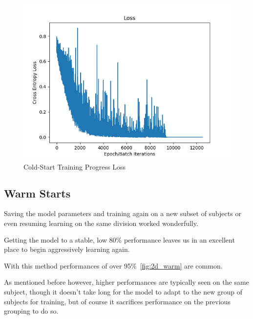  \begin{figure}
  \includegraphics[width=\linewidth]{images/cold_500_loss.png}
  \caption{Cold-Start Training Progress Loss}
  \label{fig:cold_500_loss.png}
\end{figure}

\subsection{Warm Starts}\label{subsec:warm-starts}

Saving the model parameters and training again on a new subset of subjects or even resuming learning
on the same division worked wonderfully.

Getting the model to a stable, low 80\% performance leaves us in an excellent place to begin aggressively learning again.

With this method performances of over 95\%~\ref{fig:2d_warm} are common.

As mentioned before however, higher performances are typically seen on the same subject, though it doesn't take
long for the model to adapt to the new group of subjects for training, but of course it sacrifices performance on the
previous grouping to do so.


